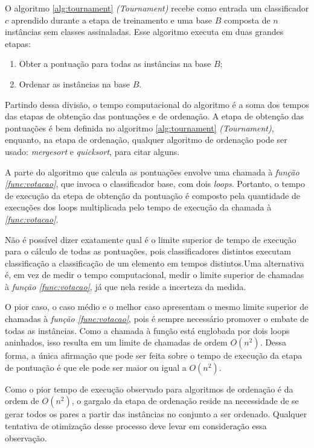 O algoritmo \ref{alg:tournament} \emph{(Tournament)} recebe como entrada um classificador $c$ aprendido durante a etapa de treinamento e uma base $B$ composta de $n$ instâncias sem classes assinaladas. Esse algoritmo executa em duas grandes etapas:

\begin{enumerate}
    \item Obter a pontuação para todas as instâncias na base $B$;
    \item Ordenar as instâncias na base $B$.
\end{enumerate}

Partindo dessa divisão, o tempo computacional do algoritmo é a soma dos tempos das etapas de obtenção das pontuações e de ordenação. A etapa de obtenção das pontuações é bem definida no algoritmo \ref{alg:tournament} \emph{(Tournament)}, enquanto, na etapa de ordenação, qualquer algoritmo de ordenação pode ser usado: \emph{mergesort} e \emph{quicksort}, para citar alguns.

A parte do algoritmo que calcula as pontuações envolve uma chamada à \emph{função \ref{func:votacao}}, que invoca o classificador base, com dois \emph{loops}. Portanto, o tempo de execução da etepa de obtenção da pontuação é composto pela quantidade de execuções dos loops multiplicada pelo tempo de execução da chamada à \emph{\ref{func:votacao}}.

Não é possível dizer exatamente qual é o limite superior de tempo de execução para o cálculo de todas as pontuações, pois classificadores distintos executam classificação a classificação de um elemento em tempos distintos.Uma alternativa é, em vez de medir o tempo computacional, medir o limite superior de chamadas à \emph{função \ref{func:votacao}}, já que nela reside a incerteza da medida.

O pior caso, o caso médio e o melhor caso apresentam o mesmo limite superior de chamadas à \emph{função \ref{func:votacao}}, pois é sempre necessário promover o embate de todas as instâncias. Como a chamada à função está englobada por dois loops aninhados, isso resulta em um limite de chamadas de ordem $O(n^2)$. Dessa forma, a única afirmação que pode ser feita sobre o tempo de execução da etapa de pontuação é que ele pode ser maior ou igual a $O(n^2)$.

Como o pior tempo de execução observado para algoritmos de ordenação é da ordem de $O(n^2)$, o gargalo da etapa de ordenação reside na necessidade de se gerar todos os pares a partir das instâncias no conjunto a ser ordenado. Qualquer tentativa de otimização desse processo deve levar em consideração essa observação.


